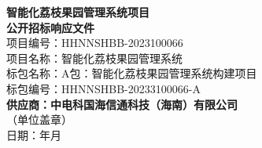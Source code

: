 \documentclass[UTF8,a4paper,12pt]{article}
\newcommand{\BidTitle}{智能化荔枝果园管理系统项目}
\newcommand{\BidDocType}{公开招标响应文件}
\newcommand{\ProjectNo}{HHNNSHBB-2023100066}
\newcommand{\ProjectName}{智能化荔枝果园管理系统}
\newcommand{\PackageName}{A包：智能化荔枝果园管理系统构建项目}
\newcommand{\PackageNo}{HHNNSHBB-20233100066-A}
\newcommand{\SupplierName}{中电科国海信通科技（海南）有限公司}
\newcommand{\BidDate}{\the\year 年\the\month 月}
\begin{document}
\thispagestyle{empty}
\begin{center}
  {\Huge\bfseries \BidTitle\\[8pt] \BidDocType}\\[36pt]
  {\large 项目编号：\ProjectNo}\\[8pt]
  {\large 项目名称：\ProjectName}\\[8pt]
  {\large 标包名称：\PackageName}\\[8pt]
  {\large 标包编号：\PackageNo}\\[24pt]
  {\Large\bfseries 供应商：\SupplierName}\\[8pt]
  {\normalsize （单位盖章）}\\[28pt]
  {\large 日期：\BidDate}
\end{center}
\clearpage

\thispagestyle{empty}
\tableofcontents
\clearpage

\setcounter{page}{1}

\end{document}

